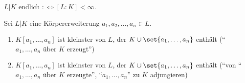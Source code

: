 \begin{definition}
	$L\vert K$ endlich $:\Leftrightarrow [L:K] < \infty$.
\end{definition}

\begin{definition}
	Sei $L\vert K$ eine Körpererweiterung $a_1, a_2, \dots, a_n \in L$.
	\begin{enumerate}
		\item $K[a_1, \dots, a_n]$ ist kleinster  von $L$, der $K \cup \set{a_1, \dots, a_n}$ enthält (``$a_1, \dots, a_n$ über $K$ erzeugt'')
		\item $K[a_1, \dots, a_n]$ ist kleinster  von $L$, der $K \cup \set{a_1, \dots, a_n}$ enthält (``von ``$a_1, \dots, a_n$ über $K$ erzeugte'', ``$a_1, \dots, a_n$'' zu $K$ adjungieren)
	\end{enumerate}
\end{definition}